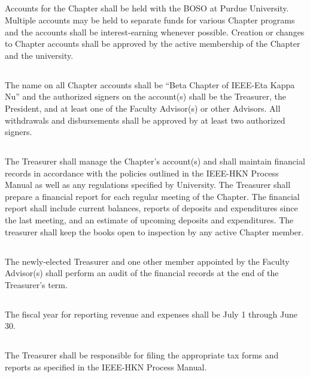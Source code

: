 \documentclass[10pt, oneside]{article}
\begin{document}
\subsection{}
Accounts for the Chapter shall be held with the BOSO at Purdue University.
Multiple accounts may be held to separate funds for various Chapter programs and the accounts shall be interest-earning whenever possible. Creation or changes to Chapter accounts shall be approved by the active membership of the Chapter and the university.

\subsection{}
The name on all Chapter accounts shall be “Beta Chapter of IEEE-Eta Kappa Nu” and the authorized signers on the account(s) shall be the Treasurer, the President, and at least one of the Faculty Advisor(s) or other Advisors. All withdrawals and disbursements shall be approved by at least two authorized signers.
\subsection{}
The Treasurer shall manage the Chapter’s account(s) and shall maintain financial records in accordance with the policies outlined in the IEEE-HKN Process Manual as well as any regulations specified by University. The Treasurer shall prepare a financial report for each regular meeting of the Chapter. The financial report shall include current balances, reports of deposits and expenditures since the last meeting, and an estimate of upcoming deposits and expenditures. The treasurer shall keep the books open to inspection by any active Chapter member.

\subsection{}
The newly-elected Treasurer and one other member appointed by the Faculty Advisor(s) shall perform an audit of the financial records at the end of the Treasurer’s term.

\subsection{}
The fiscal year for reporting revenue and expenses shall be July 1 through June 30.

\subsection{}
The Treasurer shall be responsible for filing the appropriate tax forms and reports as specified in the IEEE-HKN Process Manual.
\end{document}

